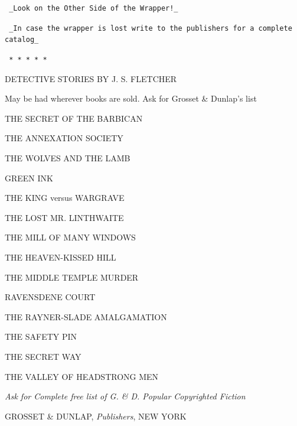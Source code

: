 \documentclass[12pt,openright]{book}
\begin{document}
\texttt{            \_Look on the Other Side of the Wrapper!\_}

\texttt{ \_In case the wrapper is lost write to the publishers for a complete}
\texttt{ catalog\_}

\texttt{   *       *       *       *       *}

DETECTIVE STORIES BY J. S. FLETCHER

May be had wherever books are sold. Ask for Grosset \& Dunlap’s list

THE SECRET OF THE BARBICAN

THE ANNEXATION SOCIETY

THE WOLVES AND THE LAMB

GREEN INK

THE KING versus WARGRAVE

THE LOST MR. LINTHWAITE

THE MILL OF MANY WINDOWS

THE HEAVEN-KISSED HILL

THE MIDDLE TEMPLE MURDER

RAVENSDENE COURT

THE RAYNER-SLADE AMALGAMATION

THE SAFETY PIN

THE SECRET WAY

THE VALLEY OF HEADSTRONG MEN

\textit{Ask for Complete free list of G. \& D. Popular Copyrighted Fiction}

GROSSET \& DUNLAP, \textit{Publishers}, NEW YORK



\backmatter

\end{document}
